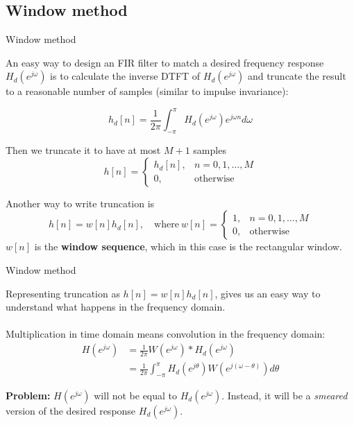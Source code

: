 \documentclass[10pt, aspectratio=169]{beamer}
\begin{document}
\subsection{Window method}
%
\begin{frame}{Window method}

An easy way to design an FIR filter to match a desired frequency response $H_d(e^{j\omega})$ is to calculate the inverse DTFT of $H_d(e^{j\omega})$ and truncate the result to a reasonable number of samples (similar to impulse invariance):

\begin{equation}
	h_d[n] = \frac{1}{2\pi}\int_{-\pi}^{\pi}H_d(e^{j\omega})e^{j\omega n} d\omega \tag{inverse DTFT}
\end{equation}

Then we truncate it to have at most $M+1$ samples
\begin{equation}
	h[n] = \begin{cases}
	h_d[n], & n = 0, 1, \ldots, M \\
	0, & \text{otherwise}
	\end{cases} \tag{truncated sequence}
\end{equation} 

Another way to write truncation is 
\begin{equation*}
	h[n] = w[n]h_d[n], \quad\text{where}~w[n] = \begin{cases}
	1, & n = 0, 1, \ldots, M \\
	0, & \text{otherwise}
	\end{cases} \tag{truncated sequence}
\end{equation*}
$w[n]$ is the \textbf{window sequence}, which in this case is the rectangular window. 
\end{frame}

\begin{frame}{Window method}

Representing truncation as $h[n] = w[n]h_d[n]$, gives us an easy way to understand what happens in the frequency domain.
~\\
~\\

Multiplication in time domain means convolution in the frequency domain:
\begin{align*}
	H(e^{j\omega}) &= \frac{1}{2\pi}W(e^{j\omega}) \ast H_d(e^{j\omega}) \\
	& = \frac{1}{2\pi}\int_{-\pi}^{\pi} H_d(e^{j\theta})W(e^{j(\omega - \theta)})d\theta \tag{convolution}
\end{align*}

\textbf{Problem:} $H(e^{j\omega})$ will not be equal to $H_d(e^{j\omega})$. Instead, it will be a \textit{smeared} version of the desired response $H_d(e^{j\omega})$.

\end{frame}
\end{document}
